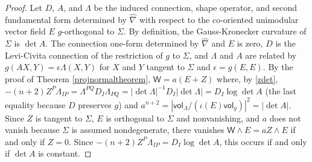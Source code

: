 \documentclass [leqno, 10pt]{amsart}
\theoremstyle{definition}
\numberwithin{equation}{section}
\newcommand{\imt}{\iota}
\newcommand{\vol}{\mathsf{vol}}
\newcommand{\nm}{\mathsf{W}}
\newcommand{\ep}{\epsilon}
\newcommand{\hnabla}{\widehat{\nabla}}
\begin{document}
\begin{proof}
Let $D$, $A$, and $\Lambda$ be the induced connection, shape operator, and second fundamental form determined by $\hnabla$ with respect to the co-oriented unimodular vector field $E$ $g$-orthogonal to $\Sigma$. By definition, the Gauss-Kronecker curvature of $\Sigma$ is $\det A$. The connection one-form determined by $\hnabla$ and $E$ is zero, $D$ is the Levi-Civita connection of the restriction of $g$ to $\Sigma$, and $\Lambda$ and $A$ are related by $g(AX, Y) = \ep\Lambda(X, Y)$ for $X$ and $Y$ tangent to $\Sigma$ and $\ep = g(E, E)$. By the proof of Theorem \ref{projnormaltheorem}, $\nm = a(E + Z)$ where, by \eqref{zdet}, $-(n+2)Z^{P}\Lambda_{IP} = \Lambda^{PQ}D_{I}\Lambda_{PQ} = |\det \Lambda|^{-1}D_{I}|\det \Lambda| = D_{I}\log \det A$ (the last equality because $D$ preserves $g$) and $a^{n+2} = |\vol_{\Lambda}/(\imt(E)\vol_{g})|^{2} = |\det A|$. Since  $Z$ is tangent to $\Sigma$, $E$ is orthogonal to $\Sigma$ and nonvanishing, and $a$ does not vanish because $\Sigma$ is assumed nondegenerate, there vanishes $\nm \wedge E = aZ \wedge E$ if and only if $Z = 0$. Since $-(n+2)Z^{P}\Lambda_{IP} = D_{I}\log \det A$, this occurs if and only if $\det A$ is constant. 
\end{proof}
\end{document}

